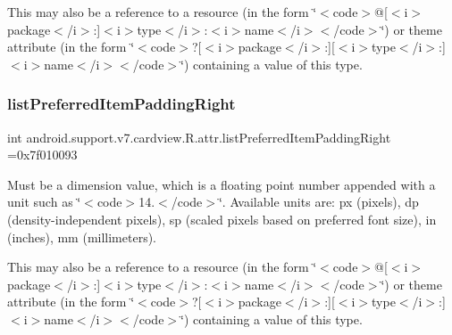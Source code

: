 This may also be a reference to a resource (in the form \char`\"{}$<$code$>$@\mbox{[}$<$i$>$package$<$/i$>$\+:\mbox{]}$<$i$>$type$<$/i$>$\+:$<$i$>$name$<$/i$>$$<$/code$>$\char`\"{}) or theme attribute (in the form \char`\"{}$<$code$>$?\mbox{[}$<$i$>$package$<$/i$>$\+:\mbox{]}\mbox{[}$<$i$>$type$<$/i$>$\+:\mbox{]}$<$i$>$name$<$/i$>$$<$/code$>$\char`\"{}) containing a value of this type. \mbox{\label{classandroid_1_1support_1_1v7_1_1cardview_1_1R_1_1attr_ad167e5c7c6361cf67c9055d74ade04c3}} 
\subsubsection{\texorpdfstring{list\+Preferred\+Item\+Padding\+Right}{listPreferredItemPaddingRight}}
{\footnotesize\ttfamily int android.\+support.\+v7.\+cardview.\+R.\+attr.\+list\+Preferred\+Item\+Padding\+Right =0x7f010093\hspace{0.3cm}{\ttfamily [static]}}

Must be a dimension value, which is a floating point number appended with a unit such as \char`\"{}$<$code$>$14.\+5sp$<$/code$>$\char`\"{}. Available units are\+: px (pixels), dp (density-\/independent pixels), sp (scaled pixels based on preferred font size), in (inches), mm (millimeters). 

This may also be a reference to a resource (in the form \char`\"{}$<$code$>$@\mbox{[}$<$i$>$package$<$/i$>$\+:\mbox{]}$<$i$>$type$<$/i$>$\+:$<$i$>$name$<$/i$>$$<$/code$>$\char`\"{}) or theme attribute (in the form \char`\"{}$<$code$>$?\mbox{[}$<$i$>$package$<$/i$>$\+:\mbox{]}\mbox{[}$<$i$>$type$<$/i$>$\+:\mbox{]}$<$i$>$name$<$/i$>$$<$/code$>$\char`\"{}) containing a value of this type. \mbox{\label{classandroid_1_1support_1_1v7_1_1cardview_1_1R_1_1attr_ad7f81cd76bf157d46c8917cf4d3d886c}} 
